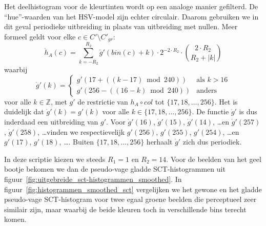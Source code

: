 Het deelhistogram voor de kleurtinten wordt op een analoge manier gefilterd. 
De ``hue''-waarden van het HSV-model zijn echter circulair. Daarom gebruiken we in dit geval
periodieke uitbreiding in plaats van uitbreiding met nullen. Meer formeel geldt voor 
elke $c \in C' \setminus C'_{gr}$:
\begin{displaymath}
\mathring{h}_A(c) = \sum_{k=-R_2}^{R_2} \mathring{g}'(bin(c)+k) \cdot 2^{-2 \cdot R_2} \cdot \binom{2 \cdot R_2}{R_2+|k|}
\end{displaymath}
waarbij
\begin{displaymath}
\mathring{g}'(k) = \begin{cases}
g'(17  + ((k-17) \bmod 240)) & \textrm{als } k > 16 \\
g'(256 - ((16-k) \bmod 240)) & \textrm{anders}
\end{cases}
\end{displaymath}
voor alle $k \in \mathbb{Z}$, met $g'$ de restrictie van $h_A \circ col$
tot $\{17,18,\ldots,256\}$. Het is duidelijk dat $\mathring{g}'(k)=g'(k)$ voor alle 
$k \in \{17,18,\ldots,256\}$. De functie $\mathring{g}'$ is dus inderdaad een uitbreiding
van $g'$. Voor $\mathring{g}'(16)$, $\mathring{g}'(15)$, $\mathring{g}'(14)$, \ldots en
$\mathring{g}'(257)$, $\mathring{g}'(258)$, \ldots vinden we respectievelijk
$g'(256)$, $g'(255)$, $g'(254)$, \ldots en $g'(17)$, $g'(18)$, \ldots . Buiten
$\{17,18,\ldots,256\}$ herhaalt $\mathring{g}'$ zich dus periodiek. 

In deze scriptie kiezen we steeds $R_1=1$ en $R_2=14$. Voor de beelden van het geel bootje
bekomen we dan de pseudo-vage gladde 
SCT-histogrammen uit figuur~\ref{fig:uitgebreide_sct-histogrammen_smoothed}.
In figuur~\ref{fig:histogrammen_smoothed_sct} vergelijken we het gewone en het gladde pseudo-vage 
SCT-histogram voor twee egaal groene beelden die perceptueel zeer similair zijn, maar waarbij 
de beide kleuren toch in verschillende bins terecht komen. 

